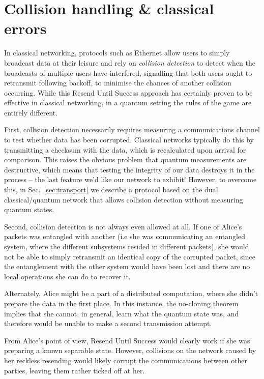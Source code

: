 \documentclass[aps,rmp,twocolumn,amsmath,amssymb,nofootinbib,superscriptaddress,longbibliography,floatfix]{revtex4-1}
\begin{document}
%
%

\section{Collision handling \& classical errors} \label{sec:collision}

In classical networking, protocols such as Ethernet allow users to simply broadcast data at their leisure and rely on \emph{collision detection} to detect when the broadcasts of multiple users have interfered, signalling that both users ought to retransmit following backoff, to minimise the chances of another collision occurring. While this {\sc Resend Until Success} approach has certainly proven to be effective in classical networking, in a quantum setting the rules of the game are entirely different.

First, collision detection necessarily requires measuring a communications channel to test whether data has been corrupted. Classical networks typically do this by transmitting a checksum with the data, which is recalculated upon arrival for comparison. This raises the obvious problem that quantum measurements are destructive, which means that testing the integrity of our data destroys it in the process -- the last feature we'd like our network to exhibit! However, to overcome this, in Sec.~\ref{sec:transport} we describe a protocol based on the dual classical/quantum network that allows collision detection without measuring quantum states.

Second, collision detection is not always even allowed at all. If one of Alice's packets was entangled with another (i.e she was communicating an entangled system, where the different subsystems resided in different packets), she would not be able to simply retransmit an identical copy of the corrupted packet, since the entanglement with the other system would have been lost and there are no local operations she can do to recover it.

Alternately, Alice might be a part of a distributed computation, where she didn't prepare the data in the first place. In this instance, the no-cloning theorem implies that she cannot, in general, learn what the quantum state was, and therefore would be unable to make a second transmission attempt.

From Alice's point of view, {\sc Resend Until Success} would clearly work if she was preparing a known separable state. However, collisions on the network caused by her reckless resending would likely corrupt the communications between other parties, leaving them rather ticked off at her.
\end{document}
